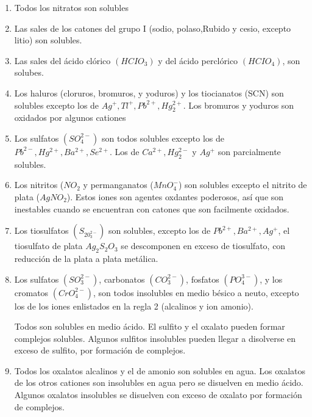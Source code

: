 \begin{enumerate}
	\item Todos los nitratos son solubles

	\item Las sales de los catones del grupo I (sodio, polaso,Rubido y cesio, excepto litio) son solubles.

	\item Las sales del ácido clórico $(HCIO_3)$ y del ácido perclórico $(HCIO_4)$, son solubes.

	\item Los haluros (cloruros, bromuros, y yoduros) y los tiocianatos (SCN) son solubles excepto los de $Ag^+,Tl^+, Pb^{2+}, Hg_2^{2+}$. Los bromuros y yoduros son oxidados por algunos cationes

	\item  Los sulfatos $(SO_4^{2-})$ son todos solubles excepto los de $Pb^{2-},Hg^{2+}, Ba^{2+}, Se^{2+}$. Los de $Ca^{2+}, Hg_2^{2-}$ y $Ag^+$ son parcialmente solubles.

	\item Los nitritos ($NO_2$ y permanganatos ($MnO_4^-$) son solubles excepto el nitrito de
	      plata ($AgNO_2$). Estos iones son agentes oxdantes poderosos, así que son
	      inestables cuando se encuentran con catones que son facilmente oxidados.

	\item Los tiosulfatos $(S_20_3^{2-} )$ son solubles, excepto los de $Pb^{2+},Ba^{2+}, Ag^+$,
	      el tiosulfato de plata $Ag_2S_2O_3$ se descomponen en exceso de tiosulfato, con
	      reducción de la plata a plata metálica.

	\item Los sulfatos $(SO_3^{2-})$, carbonatos $(CO_3^{2-})$, fosfatos $(PO_4^{3-})$, y los cromatos
	      $(CrO_4^{2-})$, son todos insolubles en medio bésico a neuto, excepto los de los
	      iones enlistados en la regla 2 (alcalinos y ion amonio).

	      Todos son solubles en medio ácido. El sulfito y el oxalato pueden formar
	      complejos solubles. Algunos sulfitos insolubles pueden llegar a disolverse en
	      exceso de sulfito, por formación de complejos.

	\item Todos los oxalatos alcalinos y el de amonio son solubles en agua. Los oxalatos
	      de los otros cationes son insolubles en agua pero se disuelven en medio ácido.
	      Algunos oxalatos insolubles se disuelven con exceso de oxalato por formación de complejos.


\end{enumerate}
